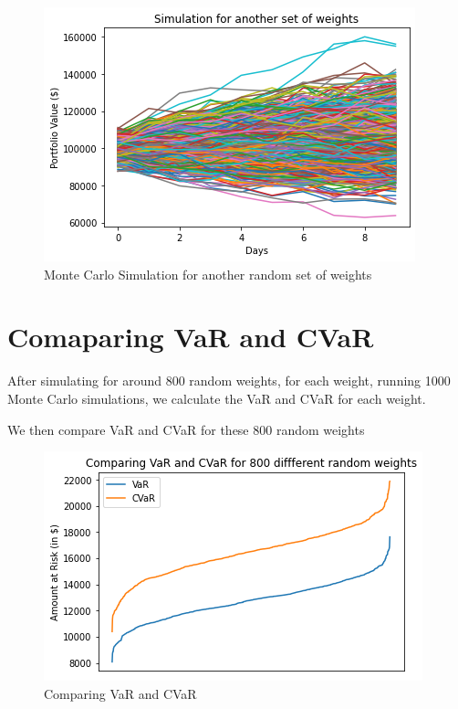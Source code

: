 \documentclass[conference]{IEEEtran}
\begin{document}
\begin{figure}[htbp]
    \centerline{\includegraphics[scale=0.55]{graphs/simulation02.png}}
    \caption{Monte Carlo Simulation for another random set of weights}
    \label{fig}
\end{figure}


    
\section{Comaparing VaR and CVaR}

After simulating for around 800 random weights, for each weight, running 1000 Monte Carlo simulations, we calculate the VaR and CVaR for each weight.

We then compare VaR and CVaR for these 800 random weights

\pagebreak

\begin{figure}[htbp]
    \centerline{\includegraphics[scale=0.55]{graphs/comparing_VaR_CVaR.png}}
    \caption{Comparing VaR and CVaR}
    \label{fig}
\end{figure}
\end{document}

